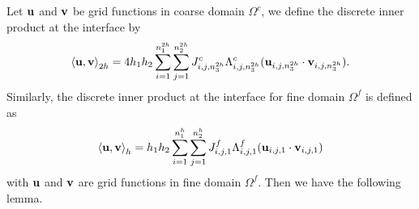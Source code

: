 Let ${\bf u}$ and ${\bf v}$ be grid functions in coarse domain $\Omega^c$, we define the discrete inner product at the interface by
\begin{equation}\label{scalar_product_discrete_interface_c}
\left<{\bf u}, {\bf v}\right>_{2h} = 4h_1h_2\sum_{i=1}^{n_1^{2h}}\sum_{j=1}^{n_2^{2h}}{  J}_{i,j,n_3^{2h}}^{c}\Lambda^{c}_{i,j,n_3^{2h}}({\bf u}_{i,j,n_3^{2h}}\cdot {\bf v}_{i,j,n_3^{2h}}).
\end{equation}
Similarly, the discrete inner product at the interface for fine domain $\Omega^f$ is defined as
\begin{equation}\label{scalar_product_discrete_interface_f}
\left<{\bf u}, {\bf v}\right>_{h} = h_1h_2\sum_{i=1}^{n_1^{h}}\sum_{j=1}^{n_2^{h}}{  J}_{i,j,1}^{f}\Lambda^{f}_{i,j,1}({\bf u}_{i,j,1}\cdot {\bf v}_{i,j,1})
\end{equation}
with $\bf u$ and $\bf v$ are grid functions in fine domain $\Omega^f$. Then we have the following lemma.
 
